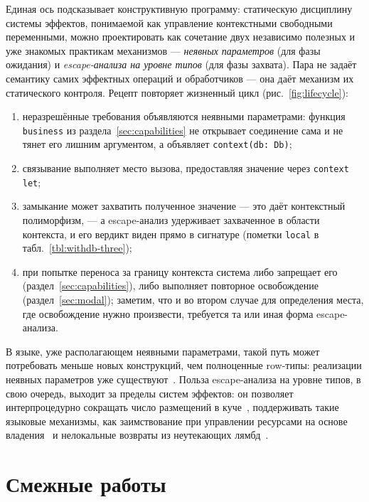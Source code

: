 \documentclass{ProcISPRAS}
\begin{document}
Единая ось подсказывает конструктивную программу: статическую дисциплину системы
эффектов, понимаемой как управление контекстными свободными переменными, можно
проектировать как сочетание двух независимо полезных и уже знакомых практикам механизмов ---
\emph{неявных параметров} (для фазы ожидания) и \emph{escape-анализа на уровне
типов} (для фазы захвата). Пара не задаёт семантику самих эффектных операций и
обработчиков --- она даёт механизм их статического контроля. Рецепт повторяет жизненный
цикл (рис.~\ref{fig:lifecycle}):
\begin{enumerate}
    \item неразрешённые требования объявляются неявными параметрами: функция
    \lstinline|business| из раздела~\ref{sec:capabilities} не открывает соединение сама
    и не тянет его лишним аргументом, а объявляет \lstinline|context(db: Db)|;
    \item связывание выполняет место вызова, предоставляя значение через
    \lstinline|context let|;
    \item замыкание может захватить полученное значение --- это даёт контекстный
    полиморфизм, --- а escape-анализ удерживает захваченное в области контекста, и его
    вердикт виден прямо в сигнатуре (пометки \lstinline|local| в
    табл.~\ref{tbl:withdb-three});
    \item при попытке переноса за границу контекста система либо запрещает его
    (раздел~\ref{sec:capabilities}), либо выполняет повторное освобождение
    (раздел~\ref{sec:modal}); заметим, что и во втором случае для определения места, где
    освобождение нужно произвести, требуется та или иная форма escape-анализа.
\end{enumerate}

В языке, уже располагающем неявными параметрами, такой путь может
потребовать меньше новых конструкций, чем полноценные row-типы: реализации неявных
параметров уже существуют~\cite{KEEP-context-parameters, oliveira2010type, lewis2000implicit}. Польза
escape-анализа на уровне типов, в свою очередь, выходит за пределы систем эффектов: он
позволяет интерпроцедурно сокращать число размещений в
куче~\cite{lorenzen2024oxidizing}, поддерживать такие языковые механизмы, как
заимствование при управлении ресурсами на основе
владения~\cite{matsakis2014rust, lorenzen2024oxidizing} и нелокальные
возвраты из неутекающих лямбд~\cite{akhin2021kotlin}.


\section{Смежные работы}
\label{sec:related}
\end{document}
